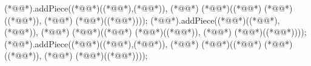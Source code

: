 \begin{vdm_al}
    (*@@*).addPiece((*@@*)((*@@*),(*@@*)), (*@@*) (*@@*)((*@@*) (*@@*)((*@@*)), (*@@*) (*@@*)((*@@*))));
    (*@@*).addPiece((*@@*)((*@@*),(*@@*)), (*@@*) (*@@*)((*@@*) (*@@*)((*@@*)), (*@@*) (*@@*)((*@@*))));
    (*@@*).addPiece((*@@*)((*@@*),(*@@*)), (*@@*) (*@@*)((*@@*) (*@@*)((*@@*)), (*@@*) (*@@*)((*@@*))));
    

\end{vdm_al}
